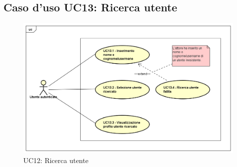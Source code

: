 \newpage
\subsection{Caso d'uso UC13: Ricerca utente}
\label{UC11}
\begin{figure}[h]
	\centering
	\includegraphics[scale=0.5]{UML/UC13.png}
	\caption{UC12: Ricerca utente}
\end{figure}